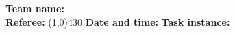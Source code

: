 \begin{flushleft}
\textbf{Team name:} \hrulefill \\ 
\vspace{0.4cm}
\textbf{Referee:} \line(1,0){430} %
\vspace{0.4cm}
\textbf{Date and time:} \hrulefill
\vspace{0.1cm}
\textbf{Task instance:} \hrulefill
\vspace{0.1cm}
\end{flushleft}
